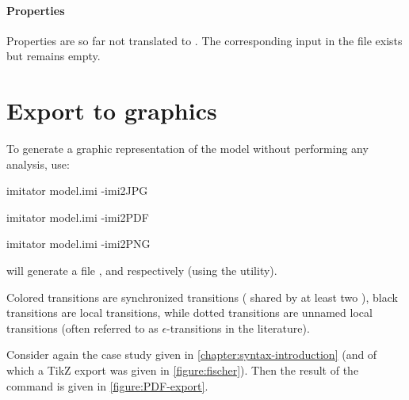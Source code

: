 \paragraph{Properties}
Properties are so far not translated to \jani{}.
The corresponding input in the \jani{} file exists but remains empty.


\section{Export to graphics}

To generate a graphic representation of the \NIPTA{} model without performing any analysis, use:

\begin{terminal}
imitator model.imi -imi2JPG
\end{terminal}

\begin{terminal}
imitator model.imi -imi2PDF
\end{terminal}

\begin{terminal}
imitator model.imi -imi2PNG
\end{terminal}

\imitator{} will generate a file ,  and  respectively (using the \gdot{} utility).

Colored transitions are synchronized transitions (\ie{} shared by at least two \IPTA{}), black transitions are local transitions, while dotted transitions are unnamed local transitions (often referred to as $\epsilon$-transitions in the literature).

\begin{example}
	Consider again the case study given in \cref{chapter:syntax-introduction} (and of which a TikZ export was given in \cref{figure:fischer}).
	Then the result of the  command is given in \cref{figure:PDF-export}.
\end{example}

